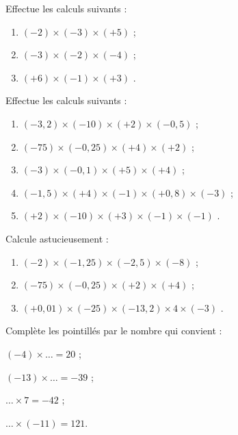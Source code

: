 \begin{exercice}
Effectue les calculs suivants :
\begin{enumerate}
 \item $(-2) \times (-3) \times (+5)$ \dotfill;
 \item $(-3) \times (-2) \times (-4)$  \dotfill;
 \item $(+6) \times (-1) \times (+3)$ \dotfill.
 \end{enumerate}
\end{exercice}


\begin{exercice}
Effectue les calculs suivants :
\begin{enumerate}
 \item $(-3,2) \times (-10) \times (+2) \times (-0,5)$  \dotfill;
 \item $(-75) \times (-0,25) \times (+4) \times (+2)$  \dotfill;
 \item $(-3) \times (-0,1) \times (+5) \times (+4)$  \dotfill;
 \item $(-1,5) \times (+4) \times (-1) \times (+0,8) \times (-3)$  \dotfill;
 \item $(+2) \times (-10) \times (+3) \times (-1) \times (-1)$ \dotfill.
 \end{enumerate}
\end{exercice}


\begin{exercice}
Calcule astucieusement :
\begin{enumerate}
 \item $(-2) \times (-1,25) \times (-2,5) \times (-8)$  \dotfill;
 \item $(-75) \times (-0,25) \times (+2) \times (+4)$  \dotfill;
 \item $(+0,01) \times (-25) \times (-13,2) \times 4 \times (-3)$ \dotfill.
 \end{enumerate}
\end{exercice}


\begin{exercice}
Complète les pointillés par le nombre qui convient :
\begin{colenumerate}{2}
 \item $(-4) \times \ldots = 20$ ;
 \item $(-13) \times \ldots = -39$ ;  
 \item $\ldots \times 7 = -42$ ;
 \item $\ldots \times (-11) = 121$.
 \end{colenumerate}
\end{exercice}


